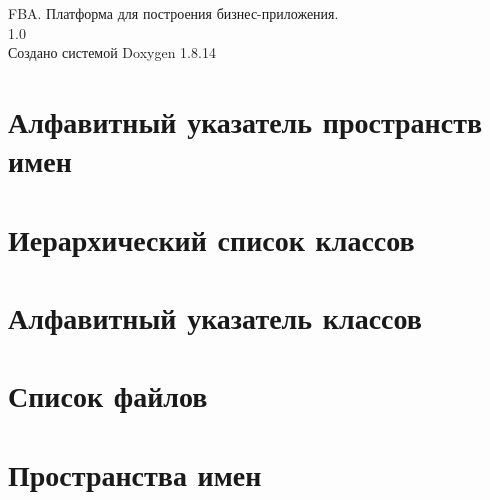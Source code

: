 \documentclass[twoside]{book}
\newcommand{\+}{\discretionary{\mbox{\scriptsize$\hookleftarrow$}}{}{}}
\newcommand{\clearemptydoublepage}{%
  \newpage{\pagestyle{empty}\cleardoublepage}%
}
\begin{document}
\hypersetup{pageanchor=false,
             bookmarksnumbered=true,
             pdfencoding=unicode
            }
\begin{titlepage}
\vspace*{7cm}
\begin{center}%
{\Large F\+BA. Платформа для построения бизнес-\/приложения. \\[1ex]\large 1.\+0 }\\
\vspace*{1cm}
{\large Создано системой Doxygen 1.8.14}\\
\end{center}
\end{titlepage}
\clearemptydoublepage
{}
\tableofcontents
\clearemptydoublepage
{}
\hypersetup{pageanchor=true}

\chapter{Алфавитный указатель пространств имен}

\chapter{Иерархический список классов}

\chapter{Алфавитный указатель классов}

\chapter{Список файлов}

\chapter{Пространства имен}

\end{document}
